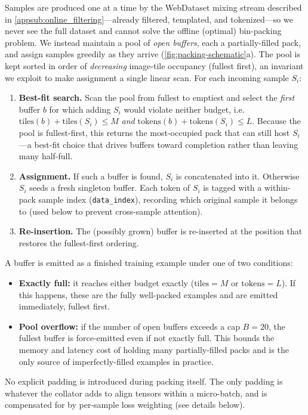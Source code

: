 Samples are produced one at a time by the WebDataset mixing stream described in \cref{appsub:online_filtering}---already filtered, templated, and tokenized---so we never see the full dataset and cannot solve the offline (optimal) bin-packing problem.
We instead maintain a pool of \emph{open buffers}, each a partially-filled pack, and assign samples greedily as they arrive (\cref{fig:packing-schematic}a).
The pool is kept sorted in order of \emph{decreasing} image-tile occupancy (fullest first), an invariant we exploit to make assignment a single linear scan.
For each incoming sample $S_i$:
\begin{enumerate}[leftmargin=*, itemsep=2pt]
    \item \textbf{Best-fit search.} Scan the pool from fullest to emptiest and select the \emph{first} buffer $b$ for which adding $S_i$ would violate neither budget, i.e.\ $\mathrm{tiles}(b) + \mathrm{tiles}(S_i) \le M$ \emph{and} $\mathrm{tokens}(b) + \mathrm{tokens}(S_i) \le L$. Because the pool is fullest-first, this returns the most-occupied pack that can still host $S_i$---a best-fit choice that drives buffers toward completion rather than leaving many half-full.
    \item \textbf{Assignment.} If such a buffer is found, $S_i$ is concatenated into it. Otherwise $S_i$ seeds a fresh singleton buffer. Each token of $S_i$ is tagged with a within-pack sample index (\texttt{data\_index}), recording which original sample it belongs to (used below to prevent cross-sample attention).
    \item \textbf{Re-insertion.} The (possibly grown) buffer is re-inserted at the position that restores the fullest-first ordering.
\end{enumerate}

A buffer is emitted as a finished training example under one of two conditions:
\begin{itemize}[leftmargin=*, itemsep=2pt]
    \item \textbf{Exactly full:} it reaches either budget exactly ($\mathrm{tiles}=M$ or $\mathrm{tokens}=L$). If this happens, these are the fully well-packed examples and are emitted immediately, fullest first.
    \item \textbf{Pool overflow:} if the number of open buffers exceeds a cap $B = 20$, the fullest buffer is force-emitted even if not exactly full. This bounds the memory and latency cost of holding many partially-filled packs and is the only source of imperfectly-filled examples in practice.
\end{itemize}
No explicit padding is introduced during packing itself. The only padding is whatever the collator adds to align tensors within a micro-batch, and is compensated for by per-sample loss weighting (see details below).

